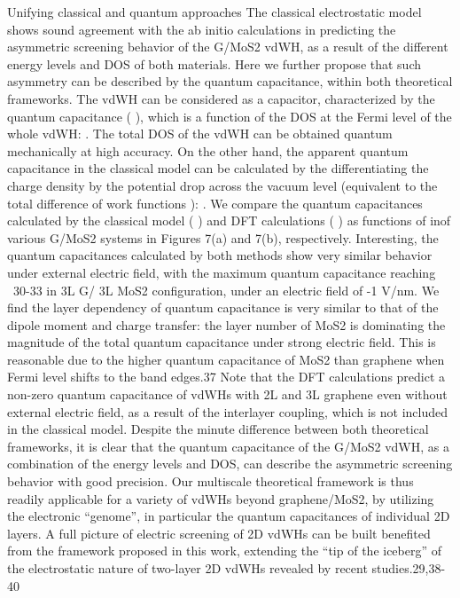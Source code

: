 Unifying classical and quantum approaches
The classical electrostatic model shows sound agreement with the ab initio calculations in predicting the asymmetric screening behavior of the G/MoS2 vdWH, as a result of the different energy levels and DOS of both materials. Here we further propose that such asymmetry can be described by the quantum capacitance, within both theoretical frameworks. The vdWH can be considered as a capacitor, characterized by the quantum capacitance ( ), which is a function of the DOS at the Fermi level of the whole vdWH:    . The total DOS of the vdWH can be obtained quantum mechanically at high accuracy. On the other hand, the apparent quantum capacitance in the classical model can be calculated by the differentiating the charge density by the potential drop across the vacuum level   (equivalent to the total difference of work functions  ):  . We compare the quantum capacitances calculated by the classical model ( ) and DFT calculations ( ) as functions of   inof various G/MoS2 systems in Figures 7(a) and 7(b), respectively. Interesting, the quantum capacitances calculated by both methods show very similar behavior under external electric field, with the maximum quantum capacitance reaching ~30-33  in 3L G/ 3L MoS2 configuration, under an electric field of -1 V/nm. We find the layer dependency of quantum capacitance is very similar to that of the dipole moment and charge transfer: the layer number of MoS2 is dominating the magnitude of the total quantum capacitance under strong electric field. This is reasonable due to the higher quantum capacitance of MoS2 than graphene when Fermi level shifts to the band edges.37 Note that the DFT calculations predict a non-zero quantum capacitance of vdWHs with 2L and 3L graphene even without external electric field, as a result of the interlayer coupling, which is not included in the classical model. Despite the minute difference between both theoretical frameworks, it is clear that the quantum capacitance of the G/MoS2 vdWH, as a combination of the energy levels and DOS, can describe the asymmetric screening behavior with good precision. Our multiscale theoretical framework is thus readily applicable for a variety of vdWHs beyond graphene/MoS2, by utilizing the electronic “genome”, in particular the quantum capacitances of individual 2D layers. A full picture of electric screening of 2D vdWHs can be built benefited from the framework proposed in this work, extending the “tip of the iceberg” of the electrostatic nature of two-layer 2D vdWHs revealed by recent studies.29,38-40

